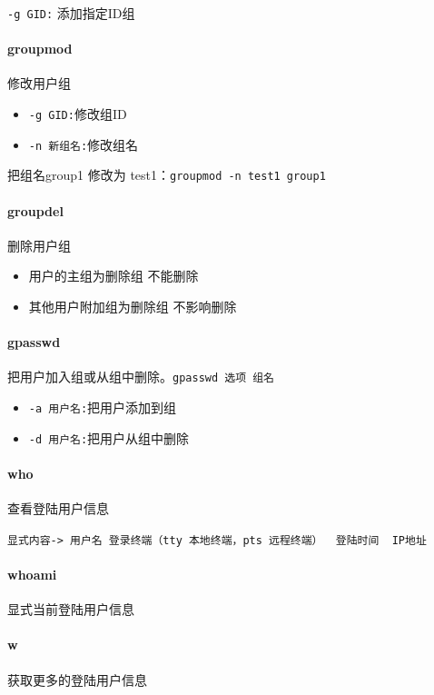 \documentclass[UTF8,a4paper,12pt]{ctexbook}
\begin{document}
				\verb|-g GID:| 添加指定ID组
			
			\paragraph{groupmod} 修改用户组
				\begin{itemize}[itemindent = 1em]
					\item \verb|-g GID:|修改组ID
					\item \verb|-n 新组名:|修改组名
				\end{itemize}
				
				把组名group1 修改为 test1：\verb|groupmod -n test1 group1|
			
			\paragraph{groupdel} 删除用户组
				\begin{itemize}[itemindent = 1em]
					\item 用户的主组为删除组 不能删除
					\item 其他用户附加组为删除组 不影响删除
				\end{itemize}
				
				
			\paragraph{gpasswd} 把用户加入组或从组中删除。\verb|gpasswd 选项 组名|
				\begin{itemize}[itemindent = 1em]
					\item \verb|-a 用户名:|把用户添加到组
					\item \verb|-d 用户名:|把用户从组中删除
				\end{itemize}	
				
				
			
			\paragraph{who} 查看登陆用户信息
				
				\verb|显式内容-> 用户名 登录终端（tty 本地终端，pts 远程终端）  登陆时间  IP地址|
			
			\paragraph{whoami} 显式当前登陆用户信息
				
			\paragraph{w} 获取更多的登陆用户信息
			
\end{document}
